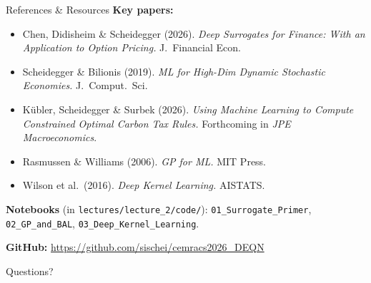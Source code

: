 \documentclass[aspectratio=169,11pt]{beamer}
\newcommand{\emphc}[1]{\textcolor{harvardcrimson}{#1}}
\begin{document}
\begin{frame}[shrink=5]{References \& Resources}
\footnotesize
\textbf{Key papers:}
\begin{itemize}\itemsep0pt \parskip0pt
  \item Chen, Didisheim \& Scheidegger (2026). \emph{Deep Surrogates for Finance: With an Application to Option Pricing.} J.\ Financial Econ.
  \item Scheidegger \& Bilionis (2019). \emph{ML for High-Dim Dynamic Stochastic Economies.} J.\ Comput.\ Sci.
  \item K\"ubler, Scheidegger \& Surbek (2026). \emph{Using Machine Learning to Compute Constrained Optimal Carbon Tax Rules.} Forthcoming in \emph{JPE Macroeconomics}.
  \item Rasmussen \& Williams (2006). \emph{GP for ML.} MIT Press.
  \item Wilson et al.\ (2016). \emph{Deep Kernel Learning.} AISTATS.
\end{itemize}

\vspace{0.1cm}
{\tiny \textbf{Notebooks} (in \texttt{lectures/lecture\_2/code/}): \texttt{01\_Surrogate\_Primer}, \texttt{02\_GP\_and\_BAL}, \texttt{03\_Deep\_Kernel\_Learning}.}

\vspace{0.15cm}
\textbf{GitHub:} \url{https://github.com/sischei/cemracs2026_DEQN}

\vspace{0.2cm}
\begin{center}
{\LARGE \emphc{Questions?}}
\end{center}
\end{frame}
\end{document}
